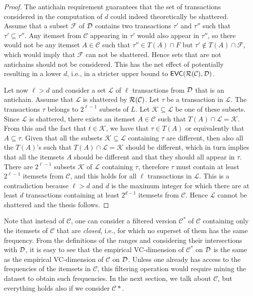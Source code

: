 \begin{proof}
  The antichain requirement guarantees that the set of transactions considered in
  the computation of $d$ could indeed theoretically be shattered. Assume that a
  subset $\mathcal{F}$ of ${\cal D}$ contains two transactions $\tau'$ and $\tau''$
  such that $\tau'\subseteq\tau''$. Any itemset from $\mathcal{C}$
  appearing in $\tau'$ would also appear in $\tau''$, so there would not be any
  itemset $A\in\mathcal{C}$ such that $\tau''\in T(A)\cap F$ but
  $\tau'\not\in T(A)\cap \mathcal{F}$, which would imply that $\mathcal{F}$ can
  not be shattered. Hence sets that are not antichains should not be
  considered. This has the net effect of potentially resulting in a lower $d$,
  i.e., in a stricter upper bound to $\mathsf{EVC}(\mathcal{R}(\mathcal{C}),{\cal D})$.

  Let now $\ell>d$ and consider a set $\mathcal{L}$ of $\ell$ transactions from
  ${\cal D}$ that is an antichain. Assume that $\mathcal{L}$ is shattered by
  $\mathcal{R}(\mathcal{C})$. Let $\tau$ be a transaction in $\mathcal{L}$.  The
  transactions $\tau$ belongs to $2^{\ell-1}$ subsets of $L$. Let
  $\mathcal{K}\subseteq \mathcal{L}$ be one of these subsets. Since
  $\mathcal{L}$ is shattered, there exists an itemset $A\in\mathcal{C}$ such
  that $T(A)\cap \mathcal{L}=\mathcal{K}$. From this and the fact that $t\in
  \mathcal{K}$, we have that $\tau\in T(A)$ or equivalently that
  $A\subseteq\tau$. Given that all the subsets $\mathcal{K}\subseteq\mathcal{L}$
  containing $\tau$ are different, then also all the $T(A)$'s such that
  $T(A)\cap \mathcal{L}=\mathcal{K}$ should be different, which in turn implies
  that all the itemsets $A$ should be different and that they should all appear
  in $\tau$. There are $2^{\ell-1}$ subsets $\mathcal{K}$ of $\mathcal{L}$
  containing $\tau$, therefore $\tau$ must contain at least $2^{\ell-1}$
  itemsets from $\mathcal{C}$, and this holds for all $\ell$ transactions in
  $\mathcal{L}$. This is a contradiction because $\ell>d$ and $d$ is the maximum
  integer for which there are at least $d$ transactions containing at least
  $2^{d-1}$ itemsets from $\mathcal{C}$. Hence $\mathcal{L}$ cannot be shattered
  and the thesis follows.
\end{proof}

Note that instead of $\mathcal{C}$, one can consider a filtered version
$\mathcal{C}^*$ of $\mathcal{C}$ containing only the itemsets of $\mathcal{C}$
that are \emph{closed}, i.e., for which no superset of them has the same
frequency. From the definitions of the ranges and considering their
intersections with ${\cal D}$, it is easy to see that the empirical VC-dimension of
$\mathcal{C}^*$ on ${\cal D}$ is the same as the empirical VC-dimension of
$\mathcal{C}$ on ${\cal D}$. Unless one already has access to the frequencies of the
itemsets in $\mathcal{C}$, this filtering operation would require mining the
dataset to obtain such frequencies. In the next section, we talk about
$\mathcal{C}$, but everything holds also if we consider $\mathcal{C}*$.

